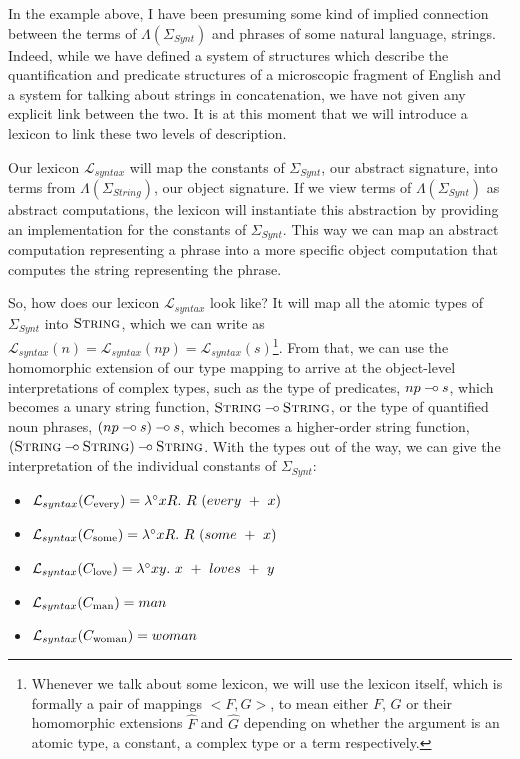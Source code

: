 \documentclass{article}
\def\limp {\mathbin{{-}\mkern-3.5mu{\circ}}}
\begin{document}
In the example above, I have been presuming some kind of implied
connection between the terms of $\Lambda(\Sigma_{Synt})$ and phrases of
some natural language, strings. Indeed, while we have defined a system
of structures which describe the quantification and predicate structures
of a microscopic fragment of English and a system for talking about
strings in concatenation, we have not given any explicit link between
the two. It is at this moment that we will introduce a lexicon to link
these two levels of description.

Our lexicon $\mathcal{L}_{syntax}$ will map the constants of
$\Sigma_{Synt}$, our abstract signature, into terms from
$\Lambda(\Sigma_{String})$, our object signature. If we view terms of
$\Lambda(\Sigma_{Synt})$ as abstract computations, the lexicon will
instantiate this abstraction by providing an implementation for the
constants of $\Sigma_{Synt}$. This way we can map an abstract
computation representing a phrase into a more specific object
computation that computes the string representing the phrase.

So, how does our lexicon $\mathcal{L}_{syntax}$ look like? It will map
all the atomic types of $\Sigma_{Synt}$ into $\textsc{String}$, which we
can write as $\mathcal{L}_{syntax}(n) = \mathcal{L}_{syntax}(np) =
\mathcal{L}_{syntax}(s)$\footnote{Whenever we talk about some lexicon,
  we will use the lexicon itself, which is formally a pair of mappings
  $\mathopen{<}F, G\mathclose{>}$, to mean either $F$, $G$ or their
  homomorphic extensions $\hat{F}$ and $\hat{G}$ depending on whether
  the argument is an atomic type, a constant, a complex type or a term
  respectively.}. From that, we can use the homomorphic extension of our
type mapping to arrive at the object-level interpretations of complex
types, such as the type of predicates, $np \limp s$, which becomes a
unary string function, $\textsc{String} \limp \textsc{String}$, or the
type of quantified noun phrases, $(np \limp s) \limp s$, which becomes a
higher-order string function, $(\textsc{String} \limp \textsc{String})
\limp \textsc{String}$. With the types out of the way, we can give the
interpretation of the individual constants of $\Sigma_{Synt}$:
\begin{itemize}
\item $\mathcal{L}_{syntax}(C_{\textrm{every}}) = \lambda^{\circ} x
  R.\ R\ (every\ +\ x)$
\item $\mathcal{L}_{syntax}(C_{\textrm{some}}) = \lambda^{\circ} x
  R.\ R\ (some\ +\ x)$
\item $\mathcal{L}_{syntax}(C_{\textrm{love}}) = \lambda^{\circ} x
  y.\ x\ +\ loves\ +\ y$
\item $\mathcal{L}_{syntax}(C_{\textrm{man}}) = man$
\item $\mathcal{L}_{syntax}(C_{\textrm{woman}}) = woman$
\end{itemize}
\end{document}
